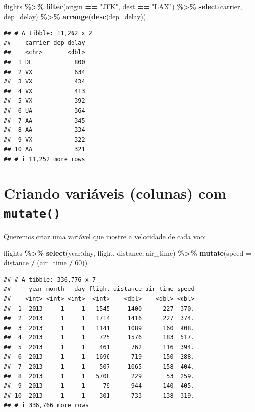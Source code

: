 \documentclass[
]{book}
\newenvironment{Shaded}{\begin{snugshade}}{\end{snugshade}}
\newcommand{\AttributeTok}[1]{\textcolor[rgb]{0.13,0.29,0.53}{#1}}
\newcommand{\DecValTok}[1]{\textcolor[rgb]{0.00,0.00,0.81}{#1}}
\newcommand{\FunctionTok}[1]{\textcolor[rgb]{0.13,0.29,0.53}{\textbf{#1}}}
\newcommand{\NormalTok}[1]{#1}
\newcommand{\SpecialCharTok}[1]{\textcolor[rgb]{0.81,0.36,0.00}{\textbf{#1}}}
\newcommand{\StringTok}[1]{\textcolor[rgb]{0.31,0.60,0.02}{#1}}
\begin{document}
\begin{Shaded}
\begin{Highlighting}[]
\NormalTok{flights }\SpecialCharTok{\%\textgreater{}\%}
    \FunctionTok{filter}\NormalTok{(origin }\SpecialCharTok{==} \StringTok{"JFK"}\NormalTok{, dest }\SpecialCharTok{==} \StringTok{"LAX"}\NormalTok{) }\SpecialCharTok{\%\textgreater{}\%}
    \FunctionTok{select}\NormalTok{(carrier, dep\_delay) }\SpecialCharTok{\%\textgreater{}\%}
    \FunctionTok{arrange}\NormalTok{(}\FunctionTok{desc}\NormalTok{(dep\_delay))}
\end{Highlighting}
\end{Shaded}

\begin{verbatim}
## # A tibble: 11,262 x 2
##    carrier dep_delay
##    <chr>       <dbl>
##  1 DL            800
##  2 VX            634
##  3 VX            434
##  4 VX            413
##  5 VX            392
##  6 UA            364
##  7 AA            345
##  8 AA            334
##  9 VX            322
## 10 AA            321
## # i 11,252 more rows
\end{verbatim}

\section{\texorpdfstring{Criando variáveis (colunas) com \texttt{mutate()}}{Criando variáveis (colunas) com mutate()}}\label{criando-variuxe1veis-colunas-com-mutate}

Queremos criar uma variável que mostre a velocidade de cada voo:

\begin{Shaded}
\begin{Highlighting}[]
\NormalTok{flights }\SpecialCharTok{\%\textgreater{}\%}
    \FunctionTok{select}\NormalTok{(year}\SpecialCharTok{:}\NormalTok{day, flight,  distance, air\_time) }\SpecialCharTok{\%\textgreater{}\%}
    \FunctionTok{mutate}\NormalTok{(}\AttributeTok{speed =}\NormalTok{ distance }\SpecialCharTok{/}\NormalTok{ (air\_time }\SpecialCharTok{/} \DecValTok{60}\NormalTok{))}
\end{Highlighting}
\end{Shaded}

\begin{verbatim}
## # A tibble: 336,776 x 7
##     year month   day flight distance air_time speed
##    <int> <int> <int>  <int>    <dbl>    <dbl> <dbl>
##  1  2013     1     1   1545     1400      227  370.
##  2  2013     1     1   1714     1416      227  374.
##  3  2013     1     1   1141     1089      160  408.
##  4  2013     1     1    725     1576      183  517.
##  5  2013     1     1    461      762      116  394.
##  6  2013     1     1   1696      719      150  288.
##  7  2013     1     1    507     1065      158  404.
##  8  2013     1     1   5708      229       53  259.
##  9  2013     1     1     79      944      140  405.
## 10  2013     1     1    301      733      138  319.
## # i 336,766 more rows
\end{verbatim}
\end{document}
